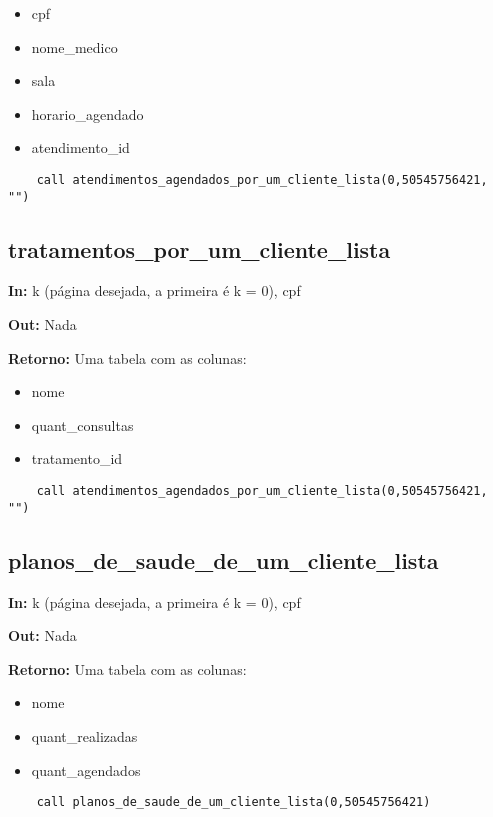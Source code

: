 \begin{itemize}
	\item cpf
	\item nome\_medico
	\item sala
	\item horario\_agendado
	\item atendimento\_id
\end{itemize}

\begin{verbatim}
	call atendimentos_agendados_por_um_cliente_lista(0,50545756421, "")
\end{verbatim}

\subsection{tratamentos\_por\_um\_cliente\_lista}

\textbf{In:} k (página desejada, a primeira é k = 0), cpf

\textbf{Out:} Nada

\textbf{Retorno:} Uma tabela com as colunas:

\begin{itemize}
	\item nome
	\item quant\_consultas
	\item tratamento\_id
\end{itemize}

\begin{verbatim}
	call atendimentos_agendados_por_um_cliente_lista(0,50545756421, "")
\end{verbatim}

\subsection{planos\_de\_saude\_de\_um\_cliente\_lista}

\textbf{In:} k (página desejada, a primeira é k = 0), cpf

\textbf{Out:} Nada

\textbf{Retorno:} Uma tabela com as colunas:

\begin{itemize}
	\item nome
	\item quant\_realizadas
	\item quant\_agendados
\end{itemize}

\begin{verbatim}
	call planos_de_saude_de_um_cliente_lista(0,50545756421)
\end{verbatim}


